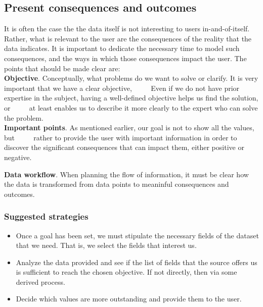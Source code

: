 \subsection{Present consequences and outcomes}

It is often the case the the data itself is not interesting to users in-and-of-itself.
Rather, what is relevant to the user are the consequences of the reality that the data indicates.
It is important to dedicate the necessary time to model such consequences, and the ways in which
those consequences impact the user. The points that should be made clear are: \\

\textbf{Objective}. Conceptually, what problems do we want to solve or clarify. It is very important that we have a clear objective,
     Even if we do not have prior expertise in the subject, having a well-defined objective helps us find the solution, or
     at least enables us to describe it more clearly to the expert who can solve the problem. \\

\textbf{Important points}. As mentioned earlier, our goal is not to show all the values, but
     rather to provide the user with important information in order to discover the significant consequences that can impact them, either positive or negative.


\textbf{Data workflow}. When planning the flow of information, it must be clear how the data is transformed from data points to meaninful consequences and outcomes.

\subsubsection*{Suggested strategies} 

\begin{itemize}
    \item Once a goal has been set, we must stipulate the necessary fields of the dataset that we need. That is, we select the fields that interest us. 
    \item Analyze the data provided and see if the list of fields that the source offers us is sufficient to reach the chosen objective.
    If not directly, then via some derived process.
    \item Decide which values are more outstanding and provide them to the user.
\end{itemize}

